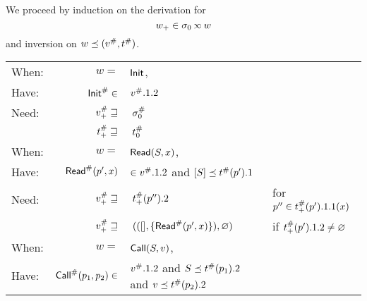 We proceed by induction on the derivation for
\[w_+\in\ctx_0\semlink w\]
and inversion on $w\preceq({v}^{\#},{t}^{\#})$.
\begin{center}
  \begin{tabular}{|l@{\hskip2pt}r@{\hskip2pt}l@{\hskip2pt}l|}
    \hline
    When: & $w=$                                & $\textsf{Init}$,                                                                          &                                                              \\
    Have: & ${\textsf{Init}}^{\#}\in$                     & ${v}^{\#}.1.2$                                                                      &                                                              \\
    Need: & ${v}^{\#}_+\sqsupseteq$              & $\:{\sigma}^{\#}_0$                                                                     &                                                              \\
          & ${t}^{\#}_+\sqsupseteq$           & $\:{t}^{\#}_0$                                                                   &                                                              \\
    \hline
    When: & $w=$                                & $\textsf{Read}(S,x)$,                                                                &                                                              \\
    Have: & ${\textsf{Read}}^{\#}(p',x)$                  & $\in{v}^{\#}.1.2$ and $[S]\preceq{t}^{\#}(p').1$                             &                                                              \\
    Need: & ${v}^{\#}_+\sqsupseteq$              & $\:{t}^{\#}_+(p'').2$                                                            & for $p''\in{t}^{\#}_+(p').1.1(x)$                          \\
          & ${v}^{\#}_+\sqsupseteq$              & $\:(([],\{{\textsf{Read}}^{\#}(p',x)\}),\varnothing)$                                        & if ${t}^{\#}_+(p').1.2\neq\varnothing$                     \\
    \hline
    When: & $w=$                                & $\textsf{Call}(S,v)$,                                                                &                                                              \\
    Have: & ${\textsf{Call}}^{\#}(p_1,p_2)\in$            & ${v}^{\#}.1.2$ and $S\preceq{t}^{\#}(p_1).2$ and $v\preceq{t}^{\#}(p_2).2$ &                                                              \\

\end{tabular}
\end{center}
